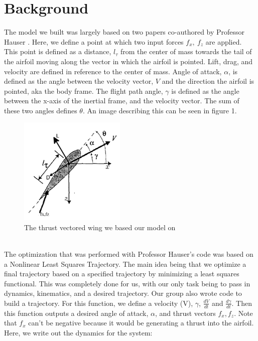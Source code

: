 \documentclass[journal]{IEEEtran}
\begin{document}
\section{Background}
The model we built was largely based on two papers co-authored by Professor Hauser \cite{Jadbabaie}\cite{Franz}. Here, we define a point at which two input forces $f_x,\ f_z$ are applied. This point is defined as a distance, $l_\tau$ from the center of mass towards the tail of the airfoil moving along the vector in which the airfoil is pointed. Lift, drag, and velocity are defined in reference to the center of mass. Angle of attack, $\alpha$, is defined as the angle between the velocity vector,
$V$ and the direction the airfoil is pointed, aka the body frame. The flight path angle, $\gamma$ is defined as the angle between the x-axis of the inertial frame, and the velocity vector. The sum of these two angles defines $\theta$. An image describing this can be seen in figure 1.
\begin{figure}[h!]
    \centering
    \includegraphics[width=0.45\textwidth]{wing_model.png}
    \caption{The thrust vectored wing we based our model on}
\end{figure}
\\
\indent The optimization that was performed with Professor Hauser's code was based on a Nonlinear Least Squares Trajectory\cite{Hauser}. The main idea being that we optimize a final trajectory based on a specified trajectory by minimizing a least squares functional. This was completely done for us, with our only task being to pass in dynamics, kinematics, and a desired trajectory. Our group also wrote code to build a trajectory. For this function, we define a velocity (V), $\gamma$, $\frac{dV}{dt}$
and $\frac{d\gamma}{dt}$. Then this function outputs a desired angle of attack, $\alpha$, and thrust vectors $f_x,f_z$. Note that $f_x$ can't be negative because it would be generating a thrust into the airfoil. Here, we write out the dynamics for the system:
\end{document}

